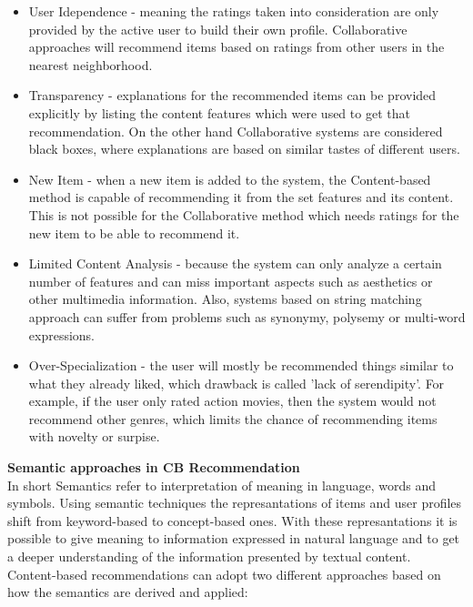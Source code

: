 \documentclass[\myFontSize,oneside,english,hidelinks,a4paper]{article}
\begin{document}
\begin{itemize}
\item User Idependence - meaning the ratings taken into consideration are only provided by the active user to build their own profile. Collaborative approaches will recommend items based on ratings from other users in the nearest neighborhood.
\item Transparency - explanations for the recommended items can be provided explicitly by listing the content features which were used to get that recommendation. On the other hand Collaborative systems are considered black boxes, where explanations are based on similar tastes of different users.
\item New Item - when a new item is added to the system, the Content-based method is capable of recommending it from the set features and its content. This is not possible for the Collaborative method which needs ratings for the new item to be able to recommend it.
\item Limited Content Analysis - because the system can only analyze a certain number of features and can miss important aspects such as aesthetics or other multimedia information. Also, systems based on string matching approach can suffer from problems such as synonymy, polysemy or multi-word expressions.
\item Over-Specialization - the user will mostly be recommended things similar to what they already liked, which drawback is called 'lack of serendipity'. For example, if the user only rated action movies, then the system would not recommend other genres, which limits the chance of recommending items with novelty or surpise. \cite{DeGemmis2015119}\\
\end{itemize}
%
%
%
%
\textbf{Semantic approaches in CB Recommendation}\\
In short Semantics refer to interpretation of meaning in language, words and symbols. Using semantic techniques the represantations of items and user profiles shift from keyword-based to concept-based ones.  With these represantations it is possible to give meaning to information expressed in natural language and to get a deeper understanding of the information presented by textual content.\\
Content-based recommendations can adopt two different approaches based on how the semantics are derived and applied:
\end{document}
